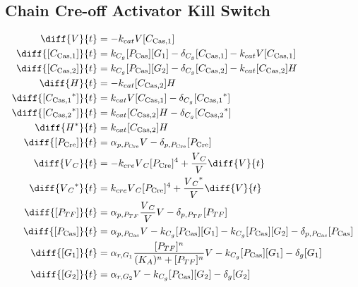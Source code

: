 \subsection{Chain Cre-off Activator Kill Switch}
\label{s:Chain_Cre_off_Activator_Kill_Switch}

\begin{align}
\diff{\vectorGen{}}{t} & = - \casCutRate{{}}\vectorGen{}\conc{\cplx{\cas}{1}}\\
\diff{\conc{\cplx{\cas}{1}}}{t} & =  \gRnaBind{}\conc{\proSp{\cas{}}}\conc{\gRna{1}} - \casCompDegradeRate{}\conc{\cplx{\cas}{1}} - \casCutRate{{}}\vectorGen{}\conc{\cplx{\cas}{1}}\\
\diff{\conc{\cplx{\cas}{2}}}{t} & =  \gRnaBind{}\conc{\proSp{\cas{}}}\conc{\gRna{2}} - \casCompDegradeRate{}\conc{\cplx{\cas}{2}} - \casCutRate{{}}\conc{\cplx{\cas}{2}}\hostGen{}\\
\diff{\hostGen{}}{t} & = - \casCutRate{{}}\conc{\cplx{\cas}{2}}\hostGen{}\\
\diff{\conc{\bound{\cplx{\cas}{1}}}}{t} & =  \casCutRate{{}}\vectorGen{}\conc{\cplx{\cas}{1}} - \casCompDegradeRate{}\conc{\bound{\cplx{\cas}{1}}}\\
\diff{\conc{\bound{\cplx{\cas}{2}}}}{t} & =  \casCutRate{{}}\conc{\cplx{\cas}{2}}\hostGen{} - \casCompDegradeRate{}\conc{\bound{\cplx{\cas}{2}}}\\
\diff{\edited{\hostGen{}}}{t} & =  \casCutRate{{}}\conc{\cplx{\cas}{2}}\hostGen{}\\
\diff{\conc{\proSp{\cre{}}}}{t} & =  \txtlRate{\proSp{\cre{}}}\vectorGen{} - \proDegradeRate{\proSp{\cre{}}}\conc{\proSp{\cre{}}}\\
\diff{\vectorGen{}_C}{t} & = - \creCutRate{} \vectorGen{}_C \conc{\proSp{\cre{}}}^4 + \frac{\vectorGen{}_C}{\vectorGen{}} \diff{\vectorGen{}}{t}\\
\diff{\edited{\vectorGen{}_C}}{t} & =  \creCutRate{} \vectorGen{}_C \conc{\proSp{\cre{}}}^4 + \frac{\edited{\vectorGen{}_C}}{\vectorGen{}} \diff{\vectorGen{}}{t}\\
\diff{\conc{\proSp{TF}}}{t} & =  \txtlRate{\proSp{TF}}\frac{\vectorGen{}_C}{\vectorGen{}}\vectorGen{} - \proDegradeRate{\proSp{TF}}\conc{\proSp{TF}}\\
\diff{\conc{\proSp{\cas{}}}}{t} & =  \txtlRate{\proSp{\cas{}}}\vectorGen{} - \gRnaBind{}\conc{\proSp{\cas{}}}\conc{\gRna{1}} - \gRnaBind{}\conc{\proSp{\cas{}}}\conc{\gRna{2}} - \proDegradeRate{\proSp{\cas{}}}\conc{\proSp{\cas{}}}\\
\diff{\conc{\gRna{1}}}{t} & =  \txRate{\gRna{1}}\frac{\conc{\proSp{TF}}^n}{(K_A)^n + \conc{\proSp{TF}}^n}\vectorGen{} - \gRnaBind{}\conc{\proSp{\cas{}}}\conc{\gRna{1}} - \rnaDegradeRate{}\conc{\gRna{1}}\\
\diff{\conc{\gRna{2}}}{t} & =  \txRate{\gRna{2}}\vectorGen{} - \gRnaBind{}\conc{\proSp{\cas{}}}\conc{\gRna{2}} - \rnaDegradeRate{}\conc{\gRna{2}}
\end{align}

